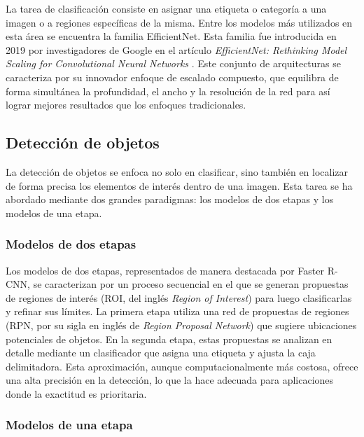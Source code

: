 La tarea de clasificación consiste en asignar una etiqueta o categoría a una imagen o a regiones específicas de la misma. Entre los modelos más utilizados en esta área se encuentra la familia EfficientNet. Esta familia fue introducida en 2019 por investigadores de Google en el artículo \textit{EfficientNet: Rethinking Model Scaling for Convolutional Neural Networks} \citep{tan_efficientnet_2020}. Este conjunto de arquitecturas se caracteriza por su innovador enfoque de escalado compuesto, que equilibra de forma simultánea la profundidad, el ancho y la resolución de la red para así lograr mejores resultados que los enfoques tradicionales.

\subsection{Detección de objetos}

La detección de objetos se enfoca no solo en clasificar, sino también en localizar de forma precisa los elementos de interés dentro de una imagen. Esta tarea se ha abordado mediante dos grandes paradigmas: los modelos de dos etapas y los modelos de una etapa.

\subsubsection{Modelos de dos etapas}

Los modelos de dos etapas, representados de manera destacada por Faster R-CNN, se caracterizan por un proceso secuencial en el que se generan propuestas de regiones de interés (ROI, del inglés \textit{Region of Interest}) para luego clasificarlas y refinar sus límites. La primera etapa utiliza una red de propuestas de regiones (RPN, por su sigla en inglés de \textit{Region Proposal Network}) que sugiere ubicaciones potenciales de objetos. En la segunda etapa, estas propuestas se analizan en detalle mediante un clasificador que asigna una etiqueta y ajusta la caja delimitadora. Esta aproximación, aunque computacionalmente más costosa, ofrece una alta precisión en la detección, lo que la hace adecuada para aplicaciones donde la exactitud es prioritaria.

\subsubsection{Modelos de una etapa}

